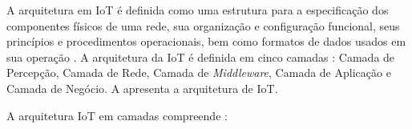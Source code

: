 
A arquitetura em \acrshort{IoT} é definida como uma estrutura para a especificação dos componentes físicos de uma rede, sua organização e configuração funcional, seus princípios e procedimentos operacionais, bem como formatos de dados usados em sua operação \cite{Vashi2017InternetIssues}. A arquitetura da \acrshort{IoT} é definida em cinco camadas \cite{Khan2012}: Camada de Percepção, Camada de Rede, Camada de \textit{Middleware}, Camada de Aplicação e Camada de Negócio. A  apresenta a arquitetura de \acrshort{IoT}.


A arquitetura \acrshort{IoT} em camadas compreende \cite{Khan2012}:

